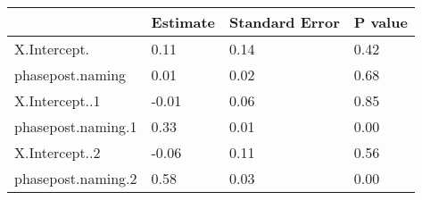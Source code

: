 


\begin{table}[tbp]

\begin{center}
\begin{threeparttable}

\caption{\label{tab:r2-cn-prepost-glmers-agegroup-tabs}}

\begin{tabular}{llll}
\toprule
 & \multicolumn{1}{c}{Estimate} & \multicolumn{1}{c}{Standard Error} & \multicolumn{1}{c}{P value}\\
\midrule
X.Intercept. & 0.11 & 0.14 & 0.42\\
phasepost.naming & 0.01 & 0.02 & 0.68\\
X.Intercept..1 & -0.01 & 0.06 & 0.85\\
phasepost.naming.1 & 0.33 & 0.01 & 0.00\\
X.Intercept..2 & -0.06 & 0.11 & 0.56\\
phasepost.naming.2 & 0.58 & 0.03 & 0.00\\
\bottomrule
\end{tabular}

\end{threeparttable}
\end{center}

\end{table}



